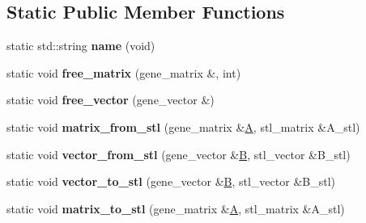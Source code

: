 \subsection*{Static Public Member Functions}
\begin{DoxyCompactItemize}
\item 
\mbox{\label{class_s_t_l__interface_a88e34ca25fa633cfc364fe841e737ed9}} 
static std\+::string {\bfseries name} (void)
\item 
\mbox{\label{class_s_t_l__interface_af794a00f163660a6bdd08417970daf00}} 
static void {\bfseries free\+\_\+matrix} (gene\+\_\+matrix \&, int)
\item 
\mbox{\label{class_s_t_l__interface_a797d9b4b7da63b67618793d1c7978d87}} 
static void {\bfseries free\+\_\+vector} (gene\+\_\+vector \&)
\item 
\mbox{\label{class_s_t_l__interface_adc82befb0d9bd90f584fc12b67d95ed5}} 
static void {\bfseries matrix\+\_\+from\+\_\+stl} (gene\+\_\+matrix \&\hyperlink{group___core___module_class_eigen_1_1_matrix}{A}, stl\+\_\+matrix \&A\+\_\+stl)
\item 
\mbox{\label{class_s_t_l__interface_aa168e5b02c97c44299f2abdf835fa89c}} 
static void {\bfseries vector\+\_\+from\+\_\+stl} (gene\+\_\+vector \&\hyperlink{group___core___module_class_eigen_1_1_matrix}{B}, stl\+\_\+vector \&B\+\_\+stl)
\item 
\mbox{\label{class_s_t_l__interface_a0ec555feb122458696a019bc0df2b764}} 
static void {\bfseries vector\+\_\+to\+\_\+stl} (gene\+\_\+vector \&\hyperlink{group___core___module_class_eigen_1_1_matrix}{B}, stl\+\_\+vector \&B\+\_\+stl)
\item 
\mbox{\label{class_s_t_l__interface_adb3c526d2e2da24fdcc8fa9f1566fccb}} 
static void {\bfseries matrix\+\_\+to\+\_\+stl} (gene\+\_\+matrix \&\hyperlink{group___core___module_class_eigen_1_1_matrix}{A}, stl\+\_\+matrix \&A\+\_\+stl)
\item 
\mbox{\label{class_s_t_l__interface_a5ffdb0a323ab2c3a27ffb80a8c3eaa05}} 

\end{DoxyCompactItemize}
